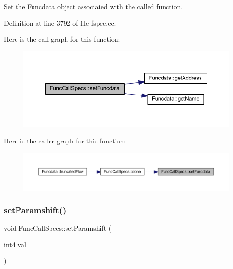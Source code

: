 Set the \mbox{\hyperlink{class_funcdata}{Funcdata}} object associated with the called function. 



Definition at line 3792 of file fspec.\+cc.

Here is the call graph for this function\+:
\nopagebreak
\begin{figure}[H]
\begin{center}
\leavevmode
\includegraphics[width=350pt]{class_func_call_specs_ae2f63fcf31daa5cc5663df227a813f0a_cgraph}
\end{center}
\end{figure}
Here is the caller graph for this function\+:
\nopagebreak
\begin{figure}[H]
\begin{center}
\leavevmode
\includegraphics[width=350pt]{class_func_call_specs_ae2f63fcf31daa5cc5663df227a813f0a_icgraph}
\end{center}
\end{figure}
\mbox{\label{class_func_call_specs_ac1c86fdb931fd085ca45ff39a091552a}} 
\subsubsection{\texorpdfstring{setParamshift()}{setParamshift()}}
{\footnotesize\ttfamily void Func\+Call\+Specs\+::set\+Paramshift (\begin{DoxyParamCaption}\item[{int4}]{val }\end{DoxyParamCaption})\hspace{0.3cm}{\ttfamily [inline]}}



